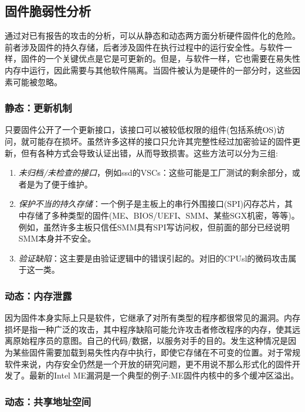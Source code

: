 \subsection{固件脆弱性分析}

通过对已有报告的攻击的分析，可以从静态和动态两方面分析硬件固件化的危险。前者涉及固件的持久存储，后者涉及固件在执行过程中的运行安全性。与软件一样，固件的一个关键优点是它是可更新的。但是，与软件一样，它也需要在易失性内存中运行，因此需要与其他软件隔离。当固件被认为是硬件的一部分时，这些因素可能被忽略。


\subsubsection{静态：更新机制}

只要固件公开了一个更新接口，该接口可以被较低权限的组件(包括系统OS)访问，就可能存在损坏。虽然许多这样的接口只允许其完整性经过加密验证的固件更新，但有各种方式会导致认证出错，从而导致损害。这些方法可以分为三组:

\begin{enumerate}


    \item \textit{未归档/未检查的接口}，例如ssd的VSCs：这些可能是工厂测试的剩余部分，或者是为了便于维护。
    \item  \textit{保护不当的持久存储}：一个例子是主板上的串行外围接口(SPI)闪存芯片，其中存储了多种类型的固件(ME、BIOS/UEFI、SMM、某些SGX机密，等等)。例如，虽然许多主板只信任SMM具有SPI写访问权，但前面的部分已经说明SMM本身并不安全。
    \item \textit{验证缺陷}：这主要是由验证逻辑中的错误引起的。对旧的CPUsl的微码攻击属于这一类。

\end{enumerate}

\subsubsection{动态：内存泄露}

因为固件本身实际上只是软件，它继承了对所有类型的程序都很常见的漏洞。内存损坏是指一种广泛的攻击，其中程序缺陷可能允许攻击者修改程序的内存，使其远离原始程序员的意图。自己的代码/数据，以服务对手的目的。发生这种情况是因为某些固件需要加载到易失性内存中执行，即使它存储在不可变的位置。对于常规软件来说，内存安全仍然是一个开放的研究问题，更不用说不那么形式化的固件开发了。最新的Intel ME漏洞是一个典型的例子:ME固件内核中的多个缓冲区溢出。

\subsubsection{动态：共享地址空间}

